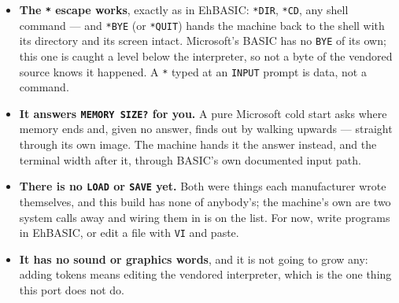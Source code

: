 \begin{itemize}[leftmargin=1.4em]
\item \textbf{The \texttt{*} escape works}, exactly as in EhBASIC:
  \verb|*DIR|, \verb|*CD|, any shell command --- and \verb|*BYE| (or
  \verb|*QUIT|) hands the machine back to the shell with its directory
  and its screen intact. Microsoft's BASIC has no \verb|BYE| of its own;
  this one is caught a level below the interpreter, so not a byte of the
  vendored source knows it happened. A \verb|*| typed at an
  \verb|INPUT| prompt is data, not a command.
\item \textbf{It answers \texttt{MEMORY SIZE?} for you.} A pure
  Microsoft cold start asks where memory ends and, given no answer,
  finds out by walking upwards --- straight through its own image. The
  machine hands it the answer instead, and the terminal width after it,
  through BASIC's own documented input path.
\item \textbf{There is no \texttt{LOAD} or \texttt{SAVE} yet.} Both were
  things each manufacturer wrote themselves, and this build has none of
  anybody's; the machine's own are two system calls away and wiring them
  in is on the list. For now, write programs in EhBASIC, or edit a file
  with \verb|VI| and paste.
\item \textbf{It has no sound or graphics words}, and it is not going to
  grow any: adding tokens means editing the vendored interpreter, which
  is the one thing this port does not do.
\end{itemize}
